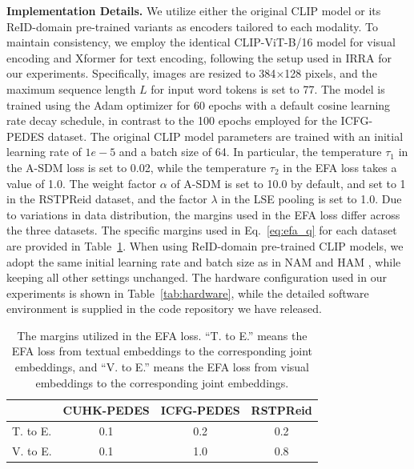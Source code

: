 \documentclass[acmsmall]{acmart}
\begin{document}
{\bfseries Implementation Details.} We utilize either the original
CLIP model \cite{radford2021learning} or its ReID-domain pre-trained
variants \cite{tan2024harnessing, jiang2025modeling} as encoders
tailored to each modality. To maintain consistency, we employ the
identical CLIP-ViT-B/16 model for visual encoding and Xformer for
text encoding, following the setup used in IRRA
\cite{jiang2023cross} for our experiments. Specifically, images are
resized to 384$\times$128 pixels, and the maximum sequence length
$L$ for input word tokens is set to 77. The model is trained using
the Adam optimizer for 60 epochs with a default cosine learning rate
decay schedule, in contrast to the 100 epochs employed for the
ICFG-PEDES dataset. The original CLIP model parameters are trained
with an initial learning rate of $1e-5$ and a batch size of 64. In
particular, the temperature $\tau_1$ in the A-SDM loss is set to
0.02, while the temperature $\tau_2$ in the EFA loss takes a value
of 1.0. The weight factor $\alpha$ of A-SDM is set to 10.0 by
default, and set to 1 in the RSTPReid dataset, and the factor
$\lambda$ in the LSE pooling is set to 1.0. Due to variations in
data distribution, the margins used in the EFA loss differ across
the three datasets. The specific margins used in
Eq.~\eqref{eq:efa_q} for each dataset are provided in
Table~\ref{tab:margin}. When using ReID-domain pre-trained CLIP
models, we adopt the same initial learning rate and batch size as in
NAM \cite{tan2024harnessing} and HAM \cite{jiang2025modeling}, while
keeping all other settings unchanged. The hardware configuration
used in our experiments is shown in Table~\ref{tab:hardware}, while
the detailed software environment is supplied in the code repository
we have released.

\begin{table}[t] \footnotesize
  \centering
  \caption{The margins utilized in the EFA loss. ``T. to E.'' means the EFA loss
from textual embeddings to the corresponding joint embeddings, and
``V. to E.'' means the EFA loss from visual embeddings to the
corresponding joint embeddings.}
  \label{tab:margin}
  \begin{tabular}{l|ccc}
    \toprule
     & CUHK-PEDES & ICFG-PEDES & RSTPReid\\
    \midrule
    T. to E. & 0.1 & 0.2 & 0.2\\
    V. to E. & 0.1 & 1.0 & 0.8\\
    \bottomrule
  \end{tabular}
\end{table}
\end{document}
